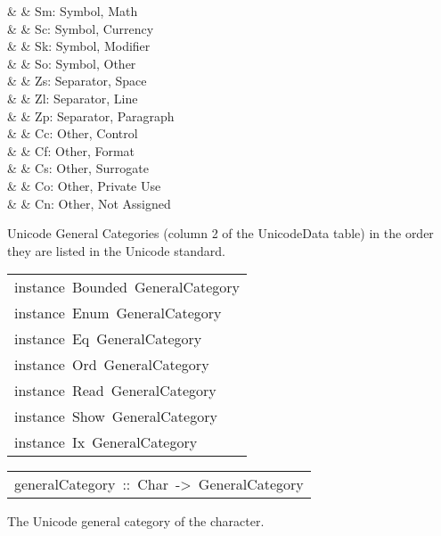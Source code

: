 \begin{haddockdesc}
\haddockdecltt{|} &  & Sm: Symbol, Math
 \\
\haddockdecltt{|} &  & Sc: Symbol, Currency
 \\
\haddockdecltt{|} &  & Sk: Symbol, Modifier
 \\
\haddockdecltt{|} &  & So: Symbol, Other
 \\
\haddockdecltt{|} &  & Zs: Separator, Space
 \\
\haddockdecltt{|} &  & Zl: Separator, Line
 \\
\haddockdecltt{|} &  & Zp: Separator, Paragraph
 \\
\haddockdecltt{|} &  & Cc: Other, Control
 \\
\haddockdecltt{|} &  & Cf: Other, Format
 \\
\haddockdecltt{|} &  & Cs: Other, Surrogate
 \\
\haddockdecltt{|} &  & Co: Other, Private Use
 \\
\haddockdecltt{|} &  & Cn: Other, Not Assigned
 \\
\haddockendconstrs\par
Unicode General Categories (column 2 of the UnicodeData table)
 in the order they are listed in the Unicode standard.
\par

\end{haddockdesc}
\begin{haddockdesc}
\item[\begin{tabular}{@{}l}
instance\ Bounded\ GeneralCategory\\instance\ Enum\ GeneralCategory\\instance\ Eq\ GeneralCategory\\instance\ Ord\ GeneralCategory\\instance\ Read\ GeneralCategory\\instance\ Show\ GeneralCategory\\instance\ Ix\ GeneralCategory
\end{tabular}]
\end{haddockdesc}
\begin{haddockdesc}
\item[\begin{tabular}{@{}l}
generalCategory\ ::\ Char\ ->\ GeneralCategory
\end{tabular}]\haddockbegindoc
The Unicode general category of the character.
\par

\end{haddockdesc}
